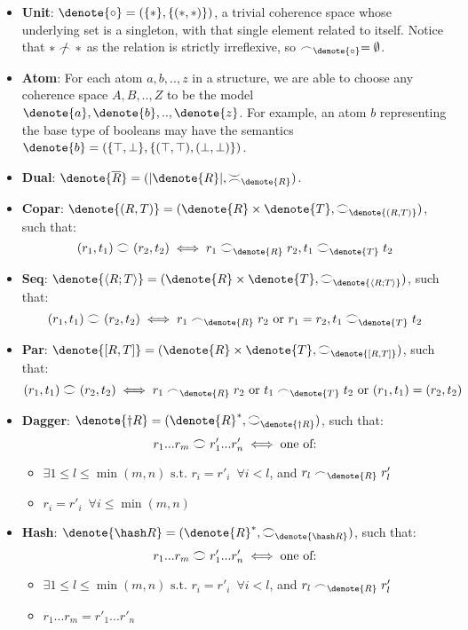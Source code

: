 \documentclass[12pt, oneside]{article}
\theoremstyle{plain}
\theoremstyle{definition}
\let\originaldagger\dagger
\renewcommand{\dag}{\mathord{\originaldagger}}
\DeclarePairedDelimiter\denote\llbracket\rrbracket
\newcommand{\la}{\langle}
\newcommand{\ra}{\rangle}
\newcommand{\coh}[1][]{\mathrel{\vcenter{\offinterlineskip\hbox{$\frown$}\vskip0.2ex\hbox{$\smile$}}_{\ifx\\#1\\\else#1\fi}}}
\newcommand{\incoh}[1][]{\mathrel{\vcenter{\offinterlineskip\hbox{$\smile$}\vskip0.2ex\hbox{$\frown$}}_{\ifx\\#1\\\else#1\fi}}}
\newcommand{\scoh}[1][]{\mathrel{\frown}_{\ifx\\#1\\\else#1\fi}}
\newcommand{\notscoh}[1][]{\mathrel{\ooalign{$\frown$\cr\hidewidth$/$\hidewidth}}_{\ifx\\#1\\\else#1\fi}}
\newcommand{\unit}{\circ}
\begin{document}
\begin{itemize}

\item
\textbf{Unit}: $\denote{\unit} = (\{*\},\{(*,*)\})$, a trivial coherence space whose underlying set is a singleton, with that single element related to itself.
Notice that $* \notscoh[] *$ as the relation is strictly irreflexive, so $\scoh[\denote{\unit}]=\emptyset$.

\item
\textbf{Atom}: For each atom $a,b,..,z$ in a structure, we are able to choose any coherence space $A,B,..,Z$ to be the model $\denote{a},\denote{b},..,\denote{z}$.
For example, an atom $b$ representing the base type of booleans may have the semantics $\denote{b} = (\{\top,\bot\},\{(\top,\top),(\bot,\bot)\})$.

\item
\textbf{Dual}: $\denote{\overline{R}}=(|\denote{R}|,\incoh[\denote{R}])$.

\item
\textbf{Copar}: $\denote{(R,T)} = (\denote{R}\times\denote{T},\coh[\denote{(R,T)}])$,
such that:
$$(r_1,t_1)\coh(r_2,t_2)\iff r_1\coh[\denote{R}]r_2, t_1\coh[\denote{T}]t_2$$

\item
\textbf{Seq}: $\denote{\la R;T\ra} = (\denote{R}\times\denote{T},\coh[\denote{\la R;T\ra}])$, such that:
$$(r_1,t_1)\coh(r_2,t_2) \iff r_1\scoh[\denote{R}]r_2 \text{ or } r_1 = r_2, t_1\coh[\denote{T}]t_2$$

\item
\textbf{Par}: $\denote{[R,T]} = (\denote{R}\times\denote{T},\coh[\denote{[R,T]}])$, such that:
$$(r_1,t_1)\coh(r_2,t_2) \iff r_1\scoh[\denote{R}]r_2 \text{ or } t_1\scoh[\denote{T}]t_2 \text{ or } (r_1,t_1)=(r_2,t_2)$$

\item
\textbf{Dagger}: $\denote{\dag R} = (\denote{R}^*, \coh[\denote{\dag R}])$, such that:
$$r_1...r_m \coh r'_1...r'_n \iff \text{one of:}$$

\begin{itemize}
    \item
    $\exists 1\leq l \leq \min(m,n) \text{ s.t. } r_i=r'_i \enspace\forall i<l$, and $r_l \scoh[\denote{R}] r'_l$

    \item
    $r_i = r'_i \enspace\forall i\le\min(m,n)$
\end{itemize}

\item
\textbf{Hash}: $\denote{\hash R} = (\denote{R}^*, \coh[\denote{\hash R}])$, such that:
$$r_1...r_m \coh r'_1...r'_n \iff \text{one of:}$$

\begin{itemize}
    \item
    $\exists 1\leq l \leq \min(m,n) \text{ s.t. } r_i=r'_i \enspace\forall i<l$, and $r_l \scoh[\denote{R}] r'_l$

    \item
    $r_1...r_m = r'_1...r'_n$
\end{itemize}

\end{itemize}
\end{document}

